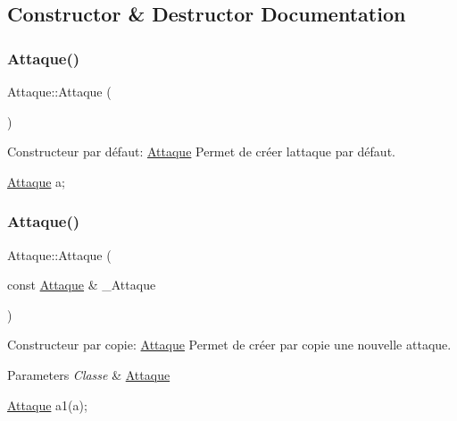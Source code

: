 \subsection{Constructor \& Destructor Documentation}
\mbox{\label{classAttaque_a1683db1342d1d26f9fc2162ef1975b23}} 
\subsubsection{\texorpdfstring{Attaque()}{Attaque()}\hspace{0.1cm}{\footnotesize\ttfamily [1/3]}}
{\footnotesize\ttfamily Attaque\+::\+Attaque (\begin{DoxyParamCaption}{ }\end{DoxyParamCaption})}



Constructeur par défaut\+: \hyperlink{classAttaque}{Attaque} Permet de créer l\textquotesingle{}attaque par défaut. 


\begin{DoxyCode}
\hyperlink{classAttaque}{Attaque} a;
\end{DoxyCode}
 \mbox{\label{classAttaque_a1a6b78c3649a5860530da68f9c6bbfbf}} 
\subsubsection{\texorpdfstring{Attaque()}{Attaque()}\hspace{0.1cm}{\footnotesize\ttfamily [2/3]}}
{\footnotesize\ttfamily Attaque\+::\+Attaque (\begin{DoxyParamCaption}\item[{const \hyperlink{classAttaque}{Attaque} \&}]{\+\_\+\+Attaque }\end{DoxyParamCaption})}



Constructeur par copie\+: \hyperlink{classAttaque}{Attaque} Permet de créer par copie une nouvelle attaque. 


\begin{DoxyParams}{Parameters}
{\em Classe} & \hyperlink{classAttaque}{Attaque} 
\begin{DoxyCode}
\hyperlink{classAttaque}{Attaque} a1(a);
\end{DoxyCode}
 \\
\hline
\end{DoxyParams}
\mbox{\label{classAttaque_a103553de7b33d7f8682f9beaa51d878a}} 
